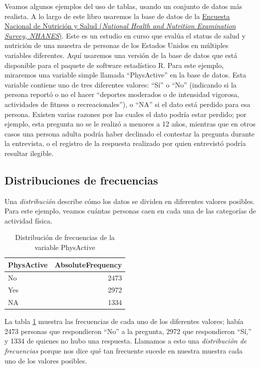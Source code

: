 \documentclass[
  12pt,
]{book}
\begin{document}
Veamos algunos ejemplos del uso de tablas, usando un conjunto de datos más realista. A lo largo de este libro usaremos la base de datos de la \href{https://www.cdc.gov/nchs/nhanes/index.htm}{Encuesta Nacional de Nutrición y Salud (\emph{National Health and Nutrition Examination Survey, NHANES})}. Este es un estudio en curso que evalúa el status de salud y nutrición de una muestra de personas de los Estados Unidos en múltiples variables diferentes. Aquí usaremos una versión de la base de datos que está disponible para el paquete de software estadístico R. Para este ejemplo, miraremos una variable simple llamada ``PhysActive'' en la base de datos. Esta variable contiene uno de tres diferentes valores: ``Sí'' o ``No'' (indicando si la persona reportó o no el hacer ``deportes moderados o de intensidad vigorosa, actividades de fitness o recreacionales''), o ``NA'' si el dato está perdido para esa persona. Existen varias razones por las cuales el dato podría estar perdido; por ejemplo, esta pregunta no se le realizó a menores a 12 años, mientras que en otros casos una persona adulta podría haber declinado el contestar la pregunta durante la entrevista, o el registro de la respuesta realizado por quien entrevistó podría resultar ilegible.

\hypertarget{frequency-distributions}{%
\subsection{Distribuciones de frecuencias}\label{frequency-distributions}}

Una \emph{distribución} describe cómo los datos se dividen en diferentes valores posibles. Para este ejemplo, veamos cuántas personas caen en cada una de las categorías de actividad física.

\begin{table}

\caption{\label{tab:PhysActiveTable}Distribución de frecuencias de la variable PhysActive}
\centering
\begin{tabular}[t]{l|r}
\hline
PhysActive & AbsoluteFrequency\\
\hline
No & 2473\\
\hline
Yes & 2972\\
\hline
NA & 1334\\
\hline
\end{tabular}
\end{table}

La tabla \ref{tab:PhysActiveTable} muestra las frecuencias de cada uno de los diferentes valores; había 2473 personas que respondieron ``No'' a la pregunta, 2972 que respondieron ``Sí,'' y 1334 de quienes no hubo una respuesta. Llamamos a esto una \emph{distribución de frecuencias} porque nos dice qué tan frecuente sucede en nuestra muestra cada uno de los valores posibles.
\end{document}
